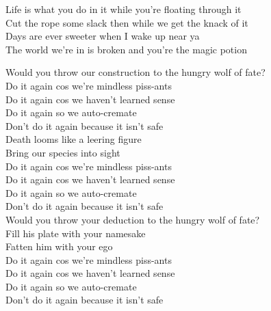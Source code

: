 Life is what you do in it while you're floating through it \\
Cut the rope some slack then while we get the knack of it \\
Days are ever sweeter when I wake up near ya \\
The world we're in is broken and you're the magic potion \\




Would you throw our construction to the hungry wolf of fate? \\

Do it again cos we're mindless piss-ants \\
Do it again cos we haven't learned sense \\
Do it again so we auto-cremate \\
Don't do it again because it isn't safe \\

Death looms like a leering figure \\
Bring our species into sight \\

Do it again cos we're mindless piss-ants \\
Do it again cos we haven't learned sense \\
Do it again so we auto-cremate \\
Don't do it again because it isn't safe \\

Would you throw your deduction to the hungry wolf of fate? \\
Fill his plate with your namesake \\
Fatten him with your ego \\

Do it again cos we're mindless piss-ants \\
Do it again cos we haven't learned sense \\
Do it again so we auto-cremate \\
Don't do it again because it isn't safe \\
